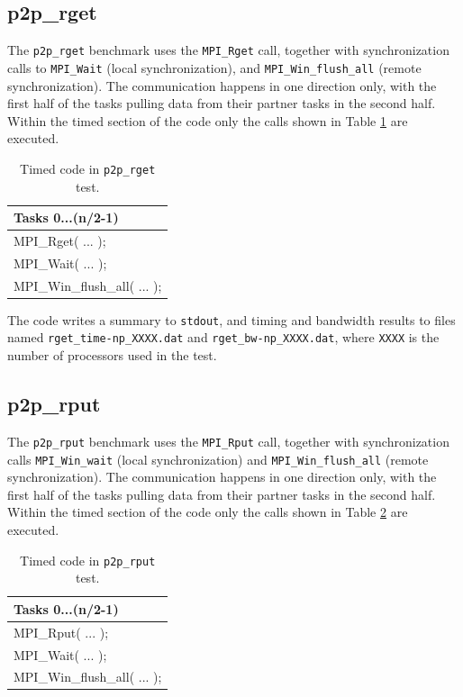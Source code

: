 \documentclass[10pt,a4paper]{report}
\begin{document}
\subsection{p2p\_rget}
The \verb+p2p_rget+ benchmark uses the \verb+MPI_Rget+ call, together with synchronization calls to \verb+MPI_Wait+ (local synchronization), and \verb+MPI_Win_flush_all+ (remote synchronization). The communication happens in one direction only, with the first half of the tasks pulling data from their partner tasks in the second half. Within the timed section of the code only the calls shown in Table \ref{tab:rget} are executed.

\begin{table}[ht]
\centering
\caption{Timed code in \texttt{p2p\_rget} test.}
\label{tab:rget}
\begin{tabular}{|l|}
\hline
\bf{Tasks 0...(n/2-1)}	   \\\hline
MPI\_Rget( ... );           \\
MPI\_Wait( ... );           \\
MPI\_Win\_flush\_all( ... );\\\hline
\end{tabular}
\end{table}

The code writes a summary to \verb+stdout+, and timing and bandwidth results to files named \verb+rget_time-np_XXXX.dat+ and \verb+rget_bw-np_XXXX.dat+, where \verb+XXXX+ is the number of processors used in the test.

\FloatBarrier
\subsection{p2p\_rput}
The \verb+p2p_rput+ benchmark uses the \verb+MPI_Rput+ call, together with synchronization calls \verb+MPI_Win_wait+ (local synchronization) and \verb+MPI_Win_flush_all+ (remote synchronization). The communication happens in one direction only, with the first half of the tasks pulling data from their partner tasks in the second half. Within the timed section of the code only the calls shown in Table \ref{tab:rput} are executed.

\begin{table}[ht]
\centering
\caption{Timed code in \texttt{p2p\_rput} test.}
\label{tab:rput}
\begin{tabular}{|l|}
\hline
\bf{Tasks 0...(n/2-1)} \\\hline
MPI\_Rput( ... );      \\
MPI\_Wait( ... );      \\
MPI\_Win\_flush\_all( ... );\\\hline
\end{tabular}
\end{table}
\end{document}
